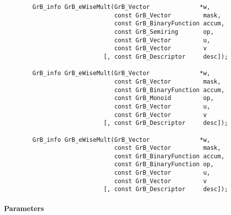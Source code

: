 \begin{verbatim}
        GrB_info GrB_eWiseMult(GrB_Vector              *w,
                               const GrB_Vector         mask,
                               const GrB_BinaryFunction accum,
                               const GrB_Semiring       op, 
                               const GrB_Vector         u,
                               const GrB_Vector         v
                            [, const GrB_Descriptor     desc]);
                            
        GrB_info GrB_eWiseMult(GrB_Vector              *w,
                               const GrB_Vector         mask,
                               const GrB_BinaryFunction accum,
                               const GrB_Monoid         op, 
                               const GrB_Vector         u,
                               const GrB_Vector         v
                            [, const GrB_Descriptor     desc]);
                            
        GrB_info GrB_eWiseMult(GrB_Vector              *w,
                               const GrB_Vector         mask,
                               const GrB_BinaryFunction accum,
                               const GrB_BinaryFunction op, 
                               const GrB_Vector         u,
                               const GrB_Vector         v
                            [, const GrB_Descriptor     desc]);
\end{verbatim}

\paragraph{Parameters}

